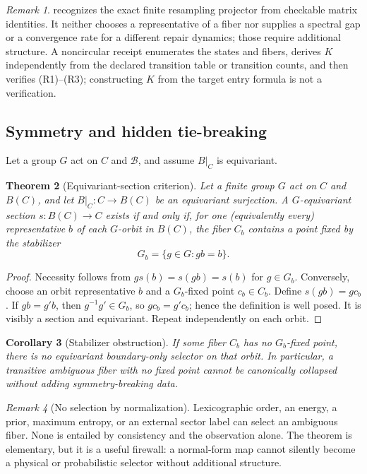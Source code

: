 \documentclass[11pt]{article}
\newtheorem{theorem}{Theorem}[section]
\newtheorem{corollary}[theorem]{Corollary}
\theoremstyle{definition}
\theoremstyle{remark}
\newtheorem{remark}[theorem]{Remark}
\numberwithin{equation}{section}
\newcommand{\cB}{\mathcal B}
\begin{document}
\begin{remark}
 recognizes the exact finite
resampling projector from checkable matrix identities.  It neither chooses a
representative of a fiber nor supplies a spectral gap or a convergence rate
for a different repair dynamics; those require additional structure.  A
noncircular receipt enumerates the states and fibers, derives $K$ independently
from the declared transition table or transition counts, and then verifies
(R1)--(R3); constructing $K$ from the target entry formula is not a
verification.
\end{remark}

\subsection{Symmetry and hidden tie-breaking}

Let a group $G$ act on $C$ and $\cB$, and assume $B|_C$ is equivariant.

\begin{theorem}[Equivariant-section criterion]\label{thm:equivariant-section}
Let a finite group $G$ act on $C$ and $B(C)$, and let $B|_C:C\to B(C)$ be an equivariant surjection.  A $G$-equivariant section $s:B(C)\to C$ exists if and only if, for one (equivalently every) representative $b$ of each $G$-orbit in $B(C)$, the fiber $C_b$ contains a point fixed by the stabilizer
\[
 G_b=\{g\in G:gb=b\}.
\]
\end{theorem}

\begin{proof}
Necessity follows from $gs(b)=s(gb)=s(b)$ for $g\in G_b$.  Conversely, choose an orbit representative $b$ and a $G_b$-fixed point $c_b\in C_b$.  Define $s(gb)=gc_b$.  If $gb=g'b$, then $g^{-1}g'\in G_b$, so $gc_b=g'c_b$; hence the definition is well posed.  It is visibly a section and equivariant.  Repeat independently on each orbit.
\end{proof}

\begin{corollary}[Stabilizer obstruction]\label{thm:stabilizer}
If some fiber $C_b$ has no $G_b$-fixed point, there is no equivariant boundary-only selector on that orbit.  In particular, a transitive ambiguous fiber with no fixed point cannot be canonically collapsed without adding symmetry-breaking data.
\end{corollary}

\begin{remark}[No selection by normalization]
Lexicographic order, an energy, a prior, maximum entropy, or an external sector label can select an ambiguous fiber.  None is entailed by consistency and the observation alone.  The theorem is elementary, but it is a useful firewall: a normal-form map cannot silently become a physical or probabilistic selector without additional structure.
\end{remark}
\end{document}

